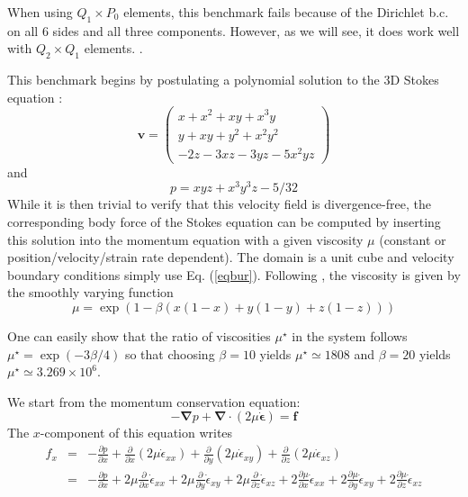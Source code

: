 When using $Q_1 \times P_0$ elements, this benchmark fails 
 because of the Dirichlet b.c. on all 6 sides and all three components.
However, as we will see, it does work well with $Q_2 \times Q_1$ elements. .

This benchmark begins by postulating a polynomial solution to the 3D Stokes equation \cite{dobo04}:
\begin{equation}
{\bm v}
=
\left(
\begin{array}{c}
x+x^2+xy+x^3y \\
y + xy + y^2 + x^2 y^2\\
-2z - 3xz - 3yz - 5x^2 yz
\end{array}
\right)
\label{eqbur}
\end{equation}
and
\begin{equation}
p = xyz + x^3 y^3z - 5/32
\end{equation}
While it is then trivial to verify that this velocity field is divergence-free,  
the corresponding body force of the Stokes equation can be computed by 
inserting this solution into the momentum equation with a given viscosity $\mu$
(constant or position/velocity/strain rate dependent). 
The domain is a unit cube and velocity boundary conditions 
simply use Eq. (\ref{eqbur}). 
Following \cite{busa13}, the viscosity
is given by the smoothly varying function
\begin{equation}
\mu = \exp(1 - \beta(x(1 - x) + y(1 - y) + z(1 - z)))
\end{equation}

One can easily show that the ratio of viscosities $\mu^\star$
in the system follows $\mu^\star=\exp(-3\beta/4)$ so that choosing $\beta=10$ yields
$\mu^\star\simeq 1808$ and $\beta=20$ yields $\mu^\star\simeq 3.269\times10^6$.


We start from the momentum conservation equation:
\[
-{\bm \nabla}p + {\bm \nabla}\cdot (2 \mu \dot{\bm \epsilon}) = {\bm f}
\]
The $x$-component of this equation writes
\begin{eqnarray}
f_x 
&=& -\frac{\partial p}{\partial x} 
+\frac{\partial}{\partial x} (2\mu \dot{\epsilon}_{xx})
+\frac{\partial}{\partial y} (2\mu \dot{\epsilon}_{xy})
+\frac{\partial}{\partial z} (2\mu \dot{\epsilon}_{xz}) \\
&=& 
-\frac{\partial p}{\partial x} 
+2\mu\frac{\partial}{\partial x} \dot{\epsilon}_{xx}
+2\mu\frac{\partial}{\partial y} \dot{\epsilon}_{xy}
+2\mu\frac{\partial}{\partial z} \dot{\epsilon}_{xz} 
+2\frac{\partial \mu}{\partial x} \dot{\epsilon}_{xx}
+2\frac{\partial \mu}{\partial y} \dot{\epsilon}_{xy}
+2\frac{\partial \mu}{\partial z} \dot{\epsilon}_{xz} 
\end{eqnarray}


